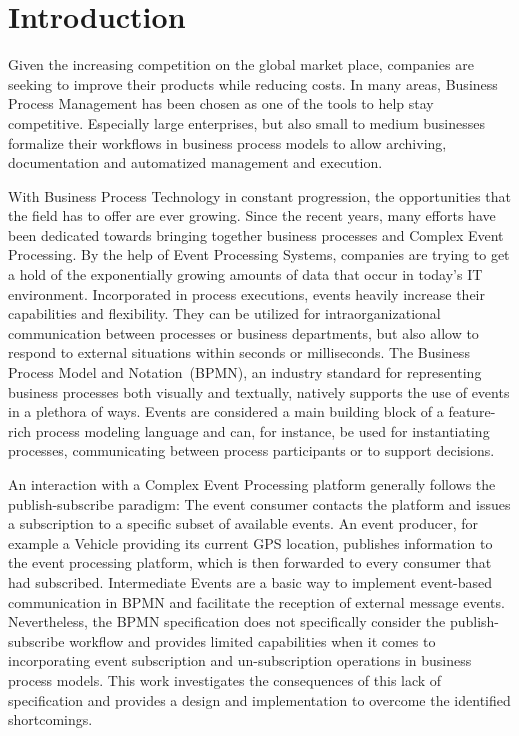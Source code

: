 \chapter{Introduction}

Given the increasing competition on the global market place, companies are seeking to improve their products while reducing costs.
In many areas, Business Process Management has been chosen as one of the tools to help stay competitive.
Especially large enterprises, but also small to medium businesses formalize their workflows in business process models to allow archiving, documentation and automatized management and execution.

With Business Process Technology in constant progression, the opportunities that the field has to offer are ever growing.
Since the recent years, many efforts have been dedicated towards bringing together business processes and Complex Event Processing.
By the help of Event Processing Systems, companies are trying to get a hold of the exponentially growing amounts of data that occur in today's IT environment.
Incorporated in process executions, events heavily increase their capabilities and flexibility. They can be utilized for intraorganizational communication between processes or business departments, but also allow to respond to external situations within seconds or milliseconds.
The Business Process Model and Notation~(BPMN), an industry standard for representing business processes both visually and textually, natively supports the use of events in a plethora of ways. Events are considered a main building block of a feature-rich process modeling language and can, for instance, be used for instantiating processes, communicating between process participants or to support decisions.

An interaction with a Complex Event Processing platform generally follows the publish-subscribe paradigm: The event consumer contacts the platform and issues a subscription to a specific subset of available events.
An event producer, for example a Vehicle providing its current GPS location, publishes information to the event processing platform, which is then forwarded to every consumer that had subscribed.
Intermediate Events are a basic way to implement event-based communication in BPMN and facilitate the reception of external message events.
Nevertheless, the BPMN specification does not specifically consider the publish-subscribe workflow and provides limited capabilities when it comes to incorporating event subscription and un-subscription operations in business process models.
This work investigates the consequences of this lack of specification and provides a design and implementation to overcome the identified shortcomings.



